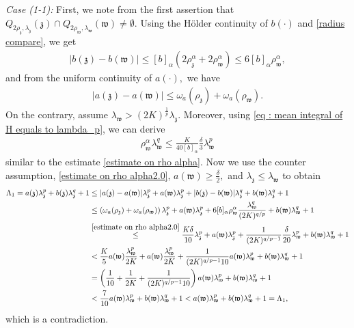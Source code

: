 \documentclass[11pt,oneside, english,reqno,twoside a4paper]{amsart}
\theoremstyle{definition}
\numberwithin{theorem}{section}
\numberwithin{equation}{section}
\begin{document}
\noindent \textit{Case (1-1):} First, we note from the first assertion that $Q_{2\rho_{\mathfrak{z}}, \lambda_{\mathfrak{z}}}(\mathfrak{z})\cap Q_{2\rho_{\mathfrak{w}}, \lambda_{\mathfrak{w}}}(\mathfrak{w})\neq \emptyset.$ Using the H\"{o}lder continuity of $b(\cdot)$ and \eqref{radius compare}, we get
\begin{align*}
    |b(\mathfrak{z})-b(\mathfrak{w})|\leq [b]_{\alpha}\left(2\rho^{\alpha}_{\mathfrak{z}}+2\rho^{\alpha}_{\mathfrak{w}}\right)\leq 6[b]_{\alpha}\rho^{\alpha}_{\mathfrak{w}},
\end{align*}
and from the uniform continuity of $a(\cdot),$ we have
\begin{align*}
    |a(\mathfrak{z})-a(\mathfrak{w})|\leq \omega_a(\rho_{\mathfrak{z}})+\omega_a(\rho_{\mathfrak{w}}).
\end{align*}
On the contrary, assume $\lambda_{\mathfrak{w}}>(2K)^{\frac{1}{p}}\lambda_{\mathfrak{z}}.$ Moreover, using \eqref{eq : mean integral of H equals to lambda_p}, we can derive
\begin{align}\label{estimate on rho alpha2.0}
    \rho^{\alpha}_{\mathfrak w}\lambda^q_{\mathfrak w}\leq \frac{K}{40 [b]_{\alpha}}\frac{\delta}{3}\lambda^p_{\mathfrak w}
\end{align}
similar to the estimate \eqref{estimate on rho alpha}.
Now we use the counter assumption, \eqref{estimate on rho alpha2.0}, $a(\mathfrak{w})\geq \frac{\delta}{2},$ and  $\lambda_{\mathfrak{z}}\leq \lambda_{\mathfrak{w}}$ to obtain
\begin{align*}
\Lambda_1=a(\mathfrak{z})\lambda^p_{\mathfrak{z}}+b(\mathfrak{z})\lambda^q_{\mathfrak{z}}+1&\leq |a(\mathfrak{z})-a(\mathfrak{w})|\lambda^p_{\mathfrak{z}}+a(\mathfrak{w})\lambda^p_{\mathfrak{z}}+|b(\mathfrak{z})-b(\mathfrak{w})|\lambda^q_{\mathfrak{z}}+b(\mathfrak{w})\lambda^q_{\mathfrak{z}}+1\\
&\leq \left(\omega_{a}(\rho_{\mathfrak{z}})+\omega_{a}(\rho_{\mathfrak{w}})\right)\lambda^p_{\mathfrak{z}}+ a(\mathfrak{w})\lambda^p_{\mathfrak{z}}+ 6[b]_{\alpha}\rho^{\alpha}_{\mathfrak{w}}\frac{\lambda^q_{\mathfrak{w}}}{(2K)^{q/p}}+b(\mathfrak{w})\lambda^q_{\mathfrak{w}}+1\\ &\overset{\eqref{estimate on rho alpha2.0}}{\leq} \frac{K \delta}{10}\lambda^p_{\mathfrak{z}}+ a(\mathfrak{w})\lambda^p_{\mathfrak{z}}+\frac{1}{(2K)^{q/p-1}}\frac{\delta}{20}\lambda^p_{\mathfrak{w}}+b(\mathfrak{w})\lambda^q_{\mathfrak{w}}+1\\
&< \frac{K}{5}a(\mathfrak{w})\frac{\lambda^p_{\mathfrak{w}}}{2K}+a(\mathfrak{w})\frac{\lambda^p_{\mathfrak{w}}}{2K}+\frac{1}{(2K)^{q/p-1 }10}a(\mathfrak{w})\lambda^p_{\mathfrak{w}}+b(\mathfrak{w})\lambda^q_{\mathfrak{w}}+1\\
&=\left(\frac{1}{10}+\frac{1}{2K}+\frac{1}{(2K)^{q/p-1}10}\right)a(\mathfrak{w})\lambda^p_{\mathfrak{w}}+b(\mathfrak{w})\lambda^q_{\mathfrak{w}}+1\\
&<\frac{7}{10}a(\mathfrak{w})\lambda^p_{\mathfrak{w}}+b(\mathfrak{w})\lambda^q_{\mathfrak{w}}+1<a(\mathfrak{w})\lambda^p_{\mathfrak{w}}+b(\mathfrak{w})\lambda^q_{\mathfrak{w}}+1=\Lambda_1,
\end{align*}
which is a contradiction.
\end{document}
